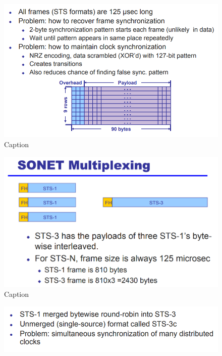 \documentclass[12pt]{book}
\begin{document}
\begin{figure}[H]
    \centering
    \includegraphics[width = \textwidth]{Pictures/SONET1.png}
    \caption{Caption}
    \label{fig:my_label}
\end{figure}
\begin{figure}[H]
    \centering
    \includegraphics[width = \textwidth]{Pictures/SONET2.png}
    \caption{Caption}
    \label{fig:my_label}
\end{figure}
\begin{figure}[H]
    \centering
    \includegraphics[width = \textwidth]{Pictures/SONET3.png}
    \label{fig:my_label}
\end{figure}
\end{document}
